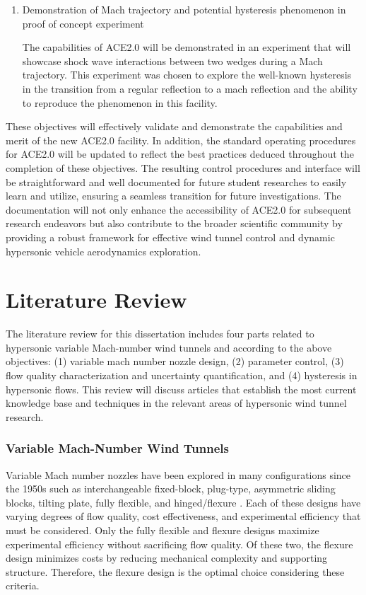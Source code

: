 \begin{enumerate}[listparindent=\parindent]
    \item Demonstration of Mach trajectory and potential hysteresis phenomenon in proof of concept experiment

        The capabilities of ACE2.0 will be demonstrated in an experiment that will showcase shock wave interactions between two wedges during a Mach trajectory. This experiment was chosen to explore the well-known hysteresis in the transition from a regular reflection to a mach reflection and the ability to reproduce the phenomenon in this facility. 

\end{enumerate}

These objectives will effectively validate and demonstrate the capabilities and merit of the new ACE2.0 facility. In addition, the standard operating procedures for ACE2.0 will be updated to reflect the best practices deduced throughout the completion of these objectives. The resulting control procedures and interface will be straightforward and well documented for future student researches to easily learn and utilize, ensuring a seamless transition for future investigations. The documentation will not only enhance the accessibility of ACE2.0 for subsequent research endeavors but also contribute to the broader scientific community by providing a robust framework for effective wind tunnel control and dynamic hypersonic vehicle aerodynamics exploration.

\section{Literature Review}

The literature review for this dissertation includes four parts related to hypersonic variable Mach-number wind tunnels and according to the above objectives: (1) variable mach number nozzle design, (2) parameter control, (3) flow quality characterization and uncertainty quantification, and (4) hysteresis in hypersonic flows. This review will discuss articles that establish the most current knowledge base and techniques in the relevant areas of hypersonic wind tunnel research.

\subsubsection{Variable Mach-Number Wind Tunnels}
Variable Mach number nozzles have been explored in many configurations since the 1950s such as interchangeable fixed-block, plug-type, asymmetric sliding blocks, tilting plate, fully flexible, and hinged/flexure \cite{agard-ag-3}. Each of these designs have varying degrees of flow quality, cost effectiveness, and experimental efficiency that must be considered. Only the fully flexible and flexure designs maximize experimental efficiency without sacrificing flow quality. Of these two, the flexure design minimizes costs by reducing mechanical complexity and supporting structure. Therefore, the flexure design is the optimal choice considering these criteria.

